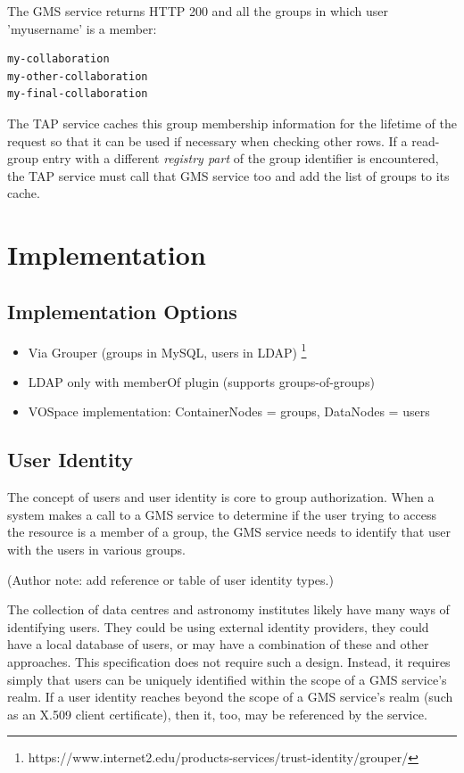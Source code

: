 \documentclass[11pt,a4paper]{ivoa}
\begin{document}
The GMS service returns HTTP 200 and all the groups in which user 'myusername' is a member:

\begin{verbatim}
my-collaboration
my-other-collaboration
my-final-collaboration
\end{verbatim}

The TAP service caches this group membership information for the lifetime of the request so that it can be used if necessary when checking other rows.  If a read-group entry with a different \emph{registry part} of the group identifier is encountered, the TAP service must call that GMS service too and add the list of groups to its cache.

\section {Implementation}

\subsection {Implementation Options}

\begin{itemize}
\item Via Grouper (groups in MySQL, users in LDAP) \footnote{https://www.internet2.edu/products-services/trust-identity/grouper/}
\item LDAP only with memberOf plugin (supports groups-of-groups)
\item VOSpace implementation: ContainerNodes = groups, DataNodes = users
\end{itemize}

\subsection{User Identity}

The concept of users and user identity is core to group authorization.  When a system makes a call to a GMS service to determine if the user trying to access the resource is a member of a group, the GMS service needs to identify that user with the users in various groups.

(Author note: add reference or table of user identity types.)

The collection of data centres and astronomy institutes likely have many ways of identifying users.  They could be using external identity providers, they could have a local database of users, or may have a combination of these and other approaches.  This specification does not require such a design.  Instead, it requires simply that users can be uniquely identified within the scope of a GMS service's realm.  If a user identity reaches beyond the scope of a GMS service's realm (such as an X.509 client certificate), then it, too, may be referenced by the service.
\end{document}
